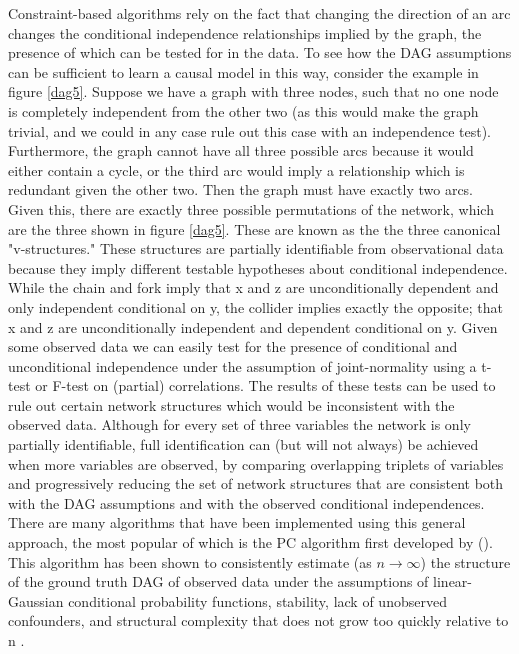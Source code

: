 \documentclass{article}
\begin{document}
Constraint-based algorithms rely on the fact that changing the direction of an arc changes the conditional independence relationships implied by the graph, the presence of which can be tested for in the data. To see how the DAG assumptions can be sufficient to learn a causal model in this way, consider the example in figure \ref{dag5}. Suppose we have a graph with three nodes, such that no one node is completely independent from the other two (as this would make the graph trivial, and we could in any case rule out this case with an independence test). Furthermore, the graph cannot have all three possible arcs because it would either contain a cycle, or the third arc would imply a relationship which is redundant given the other two. Then the graph must have exactly two arcs. Given this, there are exactly three possible permutations of the network, which are the three shown in figure \ref{dag5}. These are known as the the three canonical "v-structures." \parencite{pearl2014probabilistic} These structures are partially identifiable from observational data because they imply different testable hypotheses about conditional independence. While the chain and fork imply that x and z are unconditionally dependent and only independent conditional on y, the collider implies exactly the opposite; that x and z are unconditionally independent and dependent conditional on y. Given some observed data we can easily test for the presence of conditional and unconditional independence under the assumption of joint-normality using a t-test or F-test on (partial) correlations. The results of these tests can be used to rule out certain network structures which would be inconsistent with the observed data. Although for every set of three variables the network is only partially identifiable, full identification can (but will not always) be achieved when more variables are observed, by comparing overlapping triplets of variables and progressively reducing the set of network structures that are consistent both with the DAG assumptions and with the observed conditional independences. There are many algorithms that have been implemented using this general approach, the most popular of which is the PC algorithm first developed by \citeauthor{spirtes2000causation} (\citeyear{spirtes2000causation}). This algorithm has been shown to consistently estimate (as $n \rightarrow \infty$) the structure of the ground truth DAG of observed data under the assumptions of linear-Gaussian conditional probability functions, stability, lack of unobserved confounders, and structural complexity that does not grow too quickly relative to n \parencite{kalisch2007estimating}. 
\end{document}
